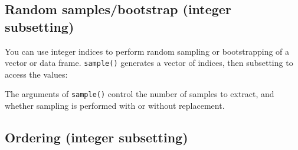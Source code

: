 \subsection{Random samples/bootstrap (integer subsetting)}

You can use integer indices to perform random sampling or bootstrapping
of a vector or data frame. \texttt{sample()} generates a vector of
indices, then subsetting to access the values: 
  

\begin{Shaded}
\begin{Highlighting}[]
\StringTok{ }\NormalTok{(} \NormalTok{(}\NormalTok{:}\NormalTok{, } \NormalTok{), } \NormalTok{:}\NormalTok{, } \NormalTok{letters[}\NormalTok{:}\NormalTok{])}

\NormalTok{(}\NormalTok{)}

\NormalTok{df[}\NormalTok{(}\NormalTok{(df)), ]}
\NormalTok{df[}\NormalTok{(}\NormalTok{), ]}
\NormalTok{df[}\NormalTok{(}\NormalTok{, } \NormalTok{T), ]}
\end{Highlighting}
\end{Shaded}

The arguments of \texttt{sample()} control the number of samples to
extract, and whether sampling is performed with or without replacement.

\subsection{Ordering (integer subsetting)}

